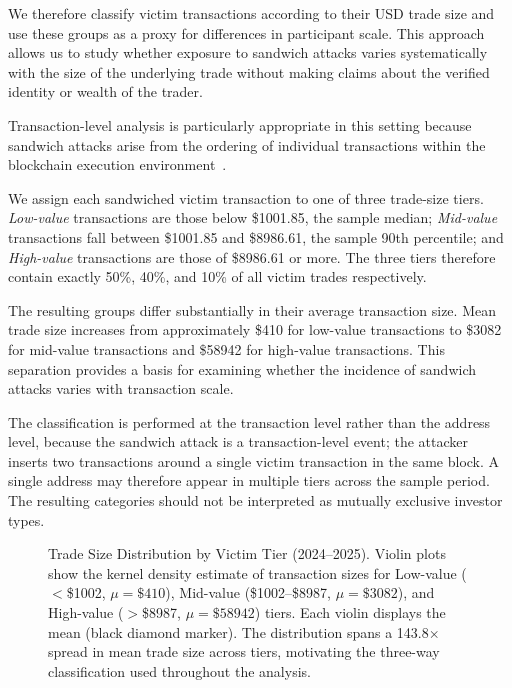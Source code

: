 \documentclass[pdflatex, sn-basic]{sn-jnl}
\theoremstyle{thmstylethree}%
\begin{document}
    We therefore classify victim transactions according to their USD trade size and use these groups as a proxy for differences in participant scale.
    This approach allows us to study whether exposure to sandwich attacks varies systematically with the size of the underlying trade without making claims about the verified identity or wealth of the trader.

    Transaction-level analysis is particularly appropriate in this setting because sandwich attacks arise from the ordering of individual transactions within the blockchain execution environment~\citep{Daian2020,Heimbach2022}.

    We assign each sandwiched victim transaction to one of three trade-size tiers.
    \emph{Low-value} transactions are those below \$\num{1001.85}, the sample median; \emph{Mid-value} transactions fall between \$\num{1001.85} and \$\num{8986.61}, the sample 90th percentile; and \emph{High-value} transactions are those of \$\num{8986.61} or more.
    The three tiers therefore contain exactly \num{50}\%, \num{40}\%, and \num{10}\% of all victim trades respectively.

    The resulting groups differ substantially in their average transaction size.
    Mean trade size increases from approximately \$\num{410} for low-value transactions to \$\num{3082} for mid-value transactions and \$\num{58942} for high-value transactions.
    This separation provides a basis for examining whether the incidence of sandwich attacks varies with transaction scale.

    The classification is performed at the transaction level rather than the address level, because the sandwich attack is a transaction-level event; the attacker inserts two transactions around a single victim transaction in the same block.
    A single address may therefore appear in multiple tiers across the sample period.
    The resulting categories should not be interpreted as mutually exclusive investor types.
    
	\begin{figure}[t]
		\centering
		
		\caption{Trade Size Distribution by Victim Tier (2024--2025).
		Violin plots show the kernel density estimate of transaction sizes for Low-value ($<$\$\num{1002}, $\mu=\$\num{410}$), Mid-value (\$\num{1002}--\$\num{8987}, $\mu=\$\num{3082}$), and High-value ($>$\$\num{8987}, $\mu=\$\num{58942}$) tiers.
		Each violin displays the mean (black diamond marker).
		The distribution spans a \num{143.8}$\times$ spread in mean trade size across tiers, motivating the three-way classification used throughout the analysis.}
		\label{fig:trade-size-distribution}
	\end{figure}
\end{document}
